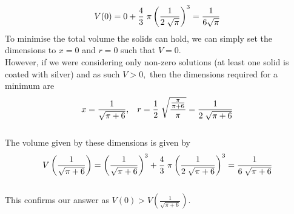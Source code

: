 \documentclass[12pt]{amsart}
\begin{document}
\begin{enumerate}
			\begin{align}
				V(0)=0+\frac{4}{3} \hspace{0.1cm} \pi\left(\frac{1}{2\hspace{0.1cm}\sqrt{\pi}}\right)^3=
				\frac{1}{6\sqrt{\pi}} \notag
			\end{align}
		To minimise the total volume the solids can hold, we can simply set the dimensions to $x=0$ and 
		$r=0$ such that $V=0$.
		\medskip
		\\
		However, if we were considering only non-zero solutions (at least one solid is coated with silver) 			and as such $V>0,$ then the dimensions required for a minimum are
		$$x=\frac{1}{\sqrt{\pi+6}}, \hspace{0.3cm} r=\frac{1}{2} \hspace{0.1cm} 
		\sqrt{\frac{\frac{\pi}{\pi+6}}{\pi}}=\frac{1}{2\hspace{0.1cm}\sqrt{\pi+6}}$$
		\\
		The volume given by these dimensions is given by
			\begin{align}
				V\left(\frac{1}{\sqrt{\pi+6}}\right)=\left(\frac{1}{\sqrt{\pi+6}}\right)^3+\frac{4}{3}
				\hspace{0.1cm} \pi \left(\frac{1}{2\hspace{0.1cm}\sqrt{\pi+6}}\right)^3=
				\frac{1}{6\hspace{0.1cm}\sqrt{\pi+6}} \notag
			\end{align}
		\\
		This confirms our answer as $V(0)>V\left(\frac{1}{\sqrt{\pi+6}}\right)$.
	
\end{enumerate}
	
\end{document}
